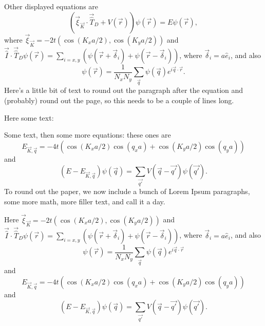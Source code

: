 \documentclass[twoside,british,a4paper]{article}
\begin{document}
Other displayed equations are
\begin{equation}
(\vec{\xi}_{\vec{K}}\cdot\vec{\hat{T}}_D+V(\vec{r}))\psi(\vec{r})=E\psi(\vec{r}),
\end{equation}
where $\vec{\xi }_{\vec{K}}=-2t(\cos(K_x a/2),\cos(K_y a/2))$ and $\vec{\hat{I}}\cdot\vec{\hat{T}}_D\psi(\vec{r})=\sum_{i=x,y}\left(\psi(\vec{r}+\vec{\delta}_i)+\psi(\vec{r}-\vec{\delta}_i)\right)$, where $\vec{\delta}_i=a\hat{e}_{i}$, and also
\begin{equation}
\psi(\vec{r})=\frac{1}{N_x N_y}\sum_{\vec{q}}\psi(\vec{q})e^{i\vec{q}\cdot\vec{r}}.
\end{equation}
Here's a little bit of text to round out the paragraph after the equation and (probably) round out the page, so this needs to be a couple of lines long.

Here some text: \lipsum[7] 

Some text, then some more equations: these ones are
$$
E_{\vec{K},\vec{q}}=-4t\left(\cos(K_xa/2)\cos(q_xa)+\cos(K_ya/2)\cos(q_ya)\right)
$$ 
and 
\begin{equation}
(E-E_{\vec{K},\vec{q}})\psi(\vec{q})=\sum_{\vec{q'}}V(\vec{q}-\vec{q'})\psi(\vec{q'}). 
\end{equation}
To round out the paper, we now include a bunch of Lorem Ipsum paragraphs, some more math, more filler text, and call it a day.

\lipsum[1-3]

Here $\vec{\xi }_{\vec{K}}=-2t(\cos(K_x a/2),\cos(K_y a/2))$ and $\vec{\hat{I}}\cdot\vec{\hat{T}}_D\psi(\vec{r})=\sum_{i=x,y}\left(\psi(\vec{r}+\vec{\delta}_i)+\psi(\vec{r}-\vec{\delta}_i)\right)$, where $\vec{\delta}_i=a\hat{e}_{i}$, and also
\begin{equation}
\psi(\vec{r})=\frac{1}{N_x N_y}\sum_{\vec{q}}\psi(\vec{q})e^{i\vec{q}\cdot\vec{r}}
\end{equation}
and
$$
E_{\vec{K},\vec{q}}=-4t\left(\cos(K_xa/2)\cos(q_xa)+\cos(K_ya/2)\cos(q_ya)\right)
$$ 
and 
\begin{equation}
(E-E_{\vec{K},\vec{q}})\psi(\vec{q})=\sum_{\vec{q'}}V(\vec{q}-\vec{q'})\psi(\vec{q'}). 
\end{equation}


\lipsum[1-6]
\end{document}
